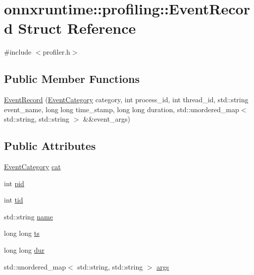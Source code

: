 \hypertarget{structonnxruntime_1_1profiling_1_1EventRecord}{}\section{onnxruntime\+:\+:profiling\+:\+:Event\+Record Struct Reference}
\label{structonnxruntime_1_1profiling_1_1EventRecord}


{\ttfamily \#include $<$profiler.\+h$>$}

\subsection*{Public Member Functions}
\begin{DoxyCompactItemize}
\item 
\mbox{\hyperlink{structonnxruntime_1_1profiling_1_1EventRecord_ab786e03ad54faa8f95d37e9e1ee481ca}{Event\+Record}} (\mbox{\hyperlink{namespaceonnxruntime_1_1profiling_acbb1d7474c26b32c5bfef2ce1ab63734}{Event\+Category}} category, int process\+\_\+id, int thread\+\_\+id, std\+::string event\+\_\+name, long long time\+\_\+stamp, long long duration, std\+::unordered\+\_\+map$<$ std\+::string, std\+::string $>$ \&\&event\+\_\+args)
\end{DoxyCompactItemize}
\subsection*{Public Attributes}
\begin{DoxyCompactItemize}
\item 
\mbox{\hyperlink{namespaceonnxruntime_1_1profiling_acbb1d7474c26b32c5bfef2ce1ab63734}{Event\+Category}} \mbox{\hyperlink{structonnxruntime_1_1profiling_1_1EventRecord_a4011d12ea3197585caa7a059d8db2dc1}{cat}}
\item 
int \mbox{\hyperlink{structonnxruntime_1_1profiling_1_1EventRecord_a209bd9fc66345301f935e61d113b7fdc}{pid}}
\item 
int \mbox{\hyperlink{structonnxruntime_1_1profiling_1_1EventRecord_af3fa46823d3c6e489af93d8d51827179}{tid}}
\item 
std\+::string \mbox{\hyperlink{structonnxruntime_1_1profiling_1_1EventRecord_ab180ebaf24bd3726e56ef72910073547}{name}}
\item 
long long \mbox{\hyperlink{structonnxruntime_1_1profiling_1_1EventRecord_ad2d926716e9a1132b3539c191aa990d3}{ts}}
\item 
long long \mbox{\hyperlink{structonnxruntime_1_1profiling_1_1EventRecord_aaed3bbfc663c4ea4c0130dd422a871ca}{dur}}
\item 
std\+::unordered\+\_\+map$<$ std\+::string, std\+::string $>$ \mbox{\hyperlink{structonnxruntime_1_1profiling_1_1EventRecord_a975e3dc6c02a05673ac3b770453365dc}{args}}
\end{DoxyCompactItemize}


